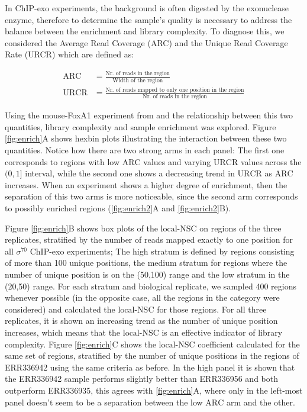 \documentclass[11pt]{article}\usepackage[]{graphicx}\usepackage[]{color}
\begin{document}
In ChIP-exo experiments, the background is often digested by the
exonuclease enzyme, therefore to determine the sample's quality is
necessary to address the balance between the enrichment and library
complexity. To diagnose this, we considered the Average Read Coverage
(ARC) and the Unique Read Coverage Rate (URCR) which are defined as:

\begin{align}
  \mbox{ARC} &= \frac{\text{Nr. of reads in the region}}{\text{Width of the region}} \nonumber \\
  \mbox{URCR} &= \frac{\text{Nr. of reads mapped to only one position
      in the region}}{\text{Nr. of reads in the region}} \nonumber
\end{align}

Using the mouse-FoxA1 experiment from \cite{exoillumina} and the
relationship between this two quantities, library complexity and
sample enrichment was explored. Figure \ref{fig:enrich}A shows hexbin
plots illustrating the interaction between these two
quantities. Notice how there are two strong arms in each panel: The
first one corresponds to regions with low $\mbox{ARC}$ values and
varying $\mbox{URCR}$ values across the $(0,1]$ interval, while the
second one shows a decreasing trend in $\mbox{URCR}$ as $\mbox{ARC}$
increases. When an experiment shows a higher degree of enrichment,
then the separation of this two arms is more noticeable, since the
second arm corresponds to possibly enriched regions
(\ref{fig:enrich2}A and \ref{fig:enrich2}B).



Figure \ref{fig:enrich}B shows box plots of the $\mbox{local-NSC}$ on
regions of the three replicates, stratified by the number of reads
mapped exactly to one position for all $\sigma^{70}$ ChIP-exo
experiments; The high stratum is defined by regions consisting of more
than 100 unique positions, the medium stratum for regions
where the number of unique position is on the
(50,100) range and the low stratum in the
(20,50) range. For each stratum and biological
replicate, we sampled 400 regions whenever possible (in the
opposite case, all the regions in the category were considered) and
calculated the $\mbox{local-NSC}$ for those regions. For all three
replicates, it is shown an increasing trend as the number of unique
position increases, which means that the $\mbox{local-NSC}$ is an
effective indicator of library complexity. Figure \ref{fig:enrich}C
shows the $\mbox{local-NSC}$ coefficient calculated for the same set
of regions, stratified by the number of unique positions in the
regions of ERR336942 using the same criteria as before. In the high
panel it is shown that the ERR336942 sample performs slightly better
than ERR336956 and both outperform ERR336935, this agrees with
\ref{fig:enrich}A, where only in the left-most panel doesn't seem to
be a separation between the low $\mbox{ARC}$ arm and the other.
\end{document}
